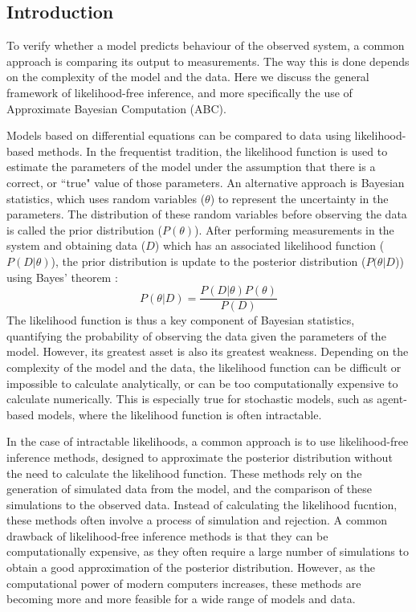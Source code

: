 \subsection{Introduction}
To verify whether a model predicts behaviour of the observed system, a common approach is comparing its
output to measurements. The way this is done depends on the complexity of the model and the data. Here
we discuss the general framework of likelihood-free inference, and more specifically the use of Approximate
Bayesian Computation (ABC). \par
Models based on differential equations can be compared to data using likelihood-based methods. In the
frequentist tradition, the likelihood function is used to estimate the parameters of the model under the
assumption that there is a correct, or ``true" value of those parameters. An alternative approach is
Bayesian statistics, which uses random variables ($\theta$) to represent the uncertainty in the parameters. The
distribution of these random variables before observing the data is called the prior distribution ($P(\theta)$).
After performing measurements in the system and obtaining data ($D$) which has an associated likelihood function
($P(D|\theta)$), the prior distribution is update to the posterior distribution ($P(\theta|D$)) using Bayes' theorem
\cite{bayes_essay_1763}:
\begin{equation}
    P(\theta|D) = \frac{P(D|\theta)P(\theta)}{P(D)}
\end{equation}
The likelihood function is thus a key component of Bayesian statistics, quantifying the probability of observing
the data given the parameters of the model. However, its greatest asset is also its greatest weakness. Depending
on the complexity of the model and the data, the likelihood function can be difficult or impossible to calculate
analytically, or can be too computationally expensive to calculate numerically. This is especially true for
stochastic models, such as agent-based models, where the likelihood function is often intractable. \par
In the case of intractable likelihoods, a common approach is to use likelihood-free inference methods, designed
to approximate the posterior distribution without the need to calculate the likelihood function. These methods
rely on the generation of simulated data from the model, and the comparison of these simulations to the observed
data. Instead of calculating the likelihood fucntion, these methods often involve a process of simulation and
rejection. A common drawback of likelihood-free inference methods is that they can be computationally expensive,
as they often require a large number of simulations to obtain a good approximation of the posterior distribution.
However, as the computational power of modern computers increases, these methods are becoming more and more
feasible for a wide range of models and data.

